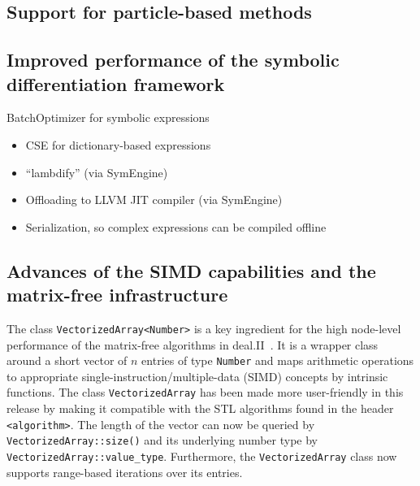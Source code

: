 \documentclass{ansarticle-preprint}
\begin{document}
\subsection{Support for particle-based methods}
\label{subsec:particles}



\subsection{Improved performance of the symbolic differentiation framework}
\label{subsec:symbdiff}


BatchOptimizer for symbolic expressions
\begin{itemize}
\item CSE for dictionary-based expressions
\item ``lambdify'' (via SymEngine)
\item Offloading to LLVM JIT compiler (via SymEngine)
\item Serialization, so complex expressions can be compiled offline
\end{itemize}


\subsection{Advances of the SIMD capabilities and the matrix-free infrastructure}
\label{subsec:mf}


The class \texttt{VectorizedArray<Number>} is a key ingredient for the high
node-level performance of the matrix-free algorithms in deal.II~\cite{KronbichlerKormann2012, KronbichlerKormann2019}. It is a wrapper
class around a short vector of $n$ entries of type \texttt{Number} and maps
arithmetic operations to appropriate single-instruction/multiple-data (SIMD)
concepts by intrinsic functions.
The class \texttt{VectorizedArray} has been made more user-friendly in this release by making
it compatible with the STL algorithms found in the header \texttt{<algorithm>}.
The length of the  vector can now be queried by  \texttt{VectorizedArray::size()} and its underlying number type by \texttt{VectorizedArray::value\_type}.
Furthermore, the \texttt{VectorizedArray} class now supports range-based iterations over its entries.
\end{document}
